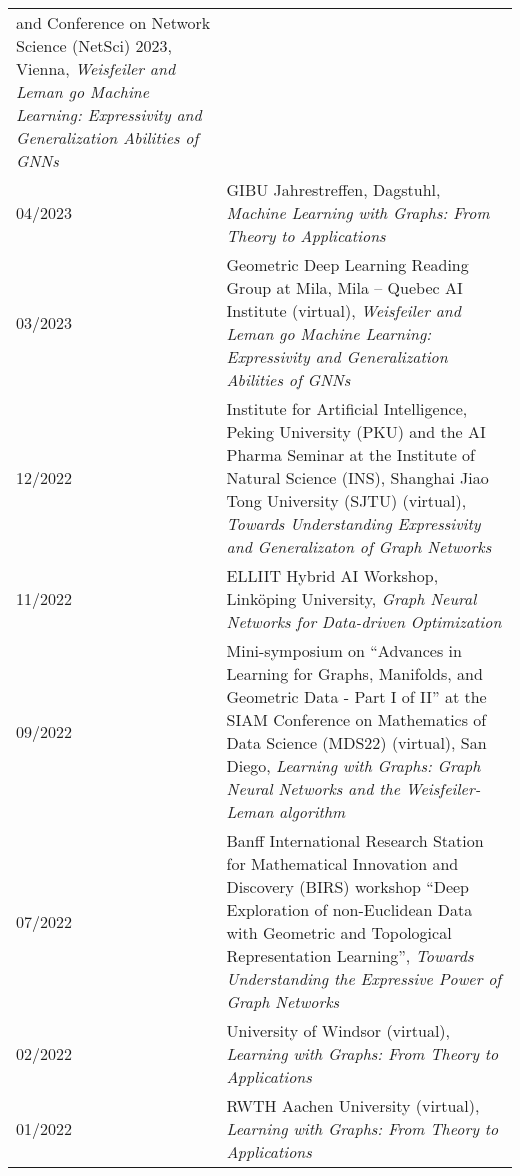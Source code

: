\documentclass[11pt, a4paper, DIV=14, headings=small]{scrartcl}
\begin{document}
\begin{longtabu}{p{2.1cm}p{12.0cm}}
		and Conference on Network Science (NetSci) 2023, Vienna, \emph{Weisfeiler and Leman go Machine Learning: Expressivity and Generalization Abilities of GNNs}\\                                                                                                                     
		04/2023 & GIBU Jahrestreffen, Dagstuhl, \emph{Machine Learning with Graphs: From Theory to Applications}                                                                                                                                                                                \\
		03/2023 & Geometric Deep Learning Reading Group at Mila, Mila -- Quebec AI Institute (virtual), \emph{Weisfeiler and Leman go Machine Learning: Expressivity and Generalization Abilities of GNNs}\\
		12/2022 & Institute for Artificial Intelligence, Peking University (PKU) and the AI Pharma Seminar at the Institute of Natural Science (INS), Shanghai Jiao Tong University (SJTU) (virtual), \emph{Towards Understanding Expressivity and Generalizaton of Graph Networks}            \\
		11/2022 & ELLIIT Hybrid AI Workshop, Linköping University, \emph{Graph Neural Networks for Data-driven Optimization}                                                                                                                                                                    \\
		09/2022 & Mini-symposium on ``Advances in Learning for Graphs, Manifolds, and Geometric Data - Part I of II'' at the SIAM Conference on Mathematics of Data Science (MDS22) (virtual), San Diego, \emph{Learning with Graphs: Graph Neural Networks and the Weisfeiler-Leman algorithm} \\
		07/2022 & Banff International Research Station for Mathematical Innovation and Discovery (BIRS) workshop ``Deep Exploration of non-Euclidean Data with Geometric and Topological Representation Learning'',  \emph{Towards Understanding the Expressive Power of Graph Networks}        \\
		02/2022 & University of Windsor (virtual), \emph{Learning with Graphs: From Theory to Applications}                                                                                                                                                                                     \\
		01/2022 & RWTH Aachen University (virtual), \emph{Learning with Graphs: From Theory to Applications}                                                                                                                                                                                    \\

\end{longtabu}
\end{document}
